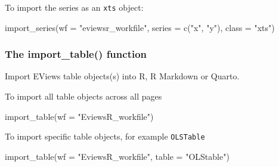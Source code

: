 \documentclass[
  letterpaper,
  DIV=11,
  numbers=noendperiod]{scrartcl}
\newenvironment{Shaded}{\begin{snugshade}}{\end{snugshade}}
\newcommand{\AttributeTok}[1]{\textcolor[rgb]{0.40,0.45,0.13}{#1}}
\newcommand{\FunctionTok}[1]{\textcolor[rgb]{0.28,0.35,0.67}{#1}}
\newcommand{\NormalTok}[1]{\textcolor[rgb]{0.00,0.23,0.31}{#1}}
\newcommand{\StringTok}[1]{\textcolor[rgb]{0.13,0.47,0.30}{#1}}
\begin{document}
\begin{figure}

\end{figure}

To import the series as an \texttt{xts} object:

\begin{Shaded}
\begin{Highlighting}[]
\FunctionTok{import\_series}\NormalTok{(}\AttributeTok{wf =} \StringTok{"eviewsr\_workfile"}\NormalTok{, }\AttributeTok{series =} \FunctionTok{c}\NormalTok{(}\StringTok{"x"}\NormalTok{, }\StringTok{"y"}\NormalTok{),}
    \AttributeTok{class =} \StringTok{"xts"}\NormalTok{)}
\end{Highlighting}
\end{Shaded}

\begin{figure}

\end{figure}

\hypertarget{the-import_table-function}{%
\subsubsection{The import\_table()
function}\label{the-import_table-function}}

Import EViews table objects(s) into R, R Markdown or Quarto.

To import all table objects across all pages

\begin{Shaded}
\begin{Highlighting}[]
\FunctionTok{import\_table}\NormalTok{(}\AttributeTok{wf =} \StringTok{"EviewsR\_workfile"}\NormalTok{)}
\end{Highlighting}
\end{Shaded}

\begin{figure}

\end{figure}

To import specific table objects, for example \texttt{OLSTable}

\begin{Shaded}
\begin{Highlighting}[]
\FunctionTok{import\_table}\NormalTok{(}\AttributeTok{wf =} \StringTok{"EviewsR\_workfile"}\NormalTok{, }\AttributeTok{table =} \StringTok{"OLStable"}\NormalTok{)}
\end{Highlighting}
\end{Shaded}
\end{document}
